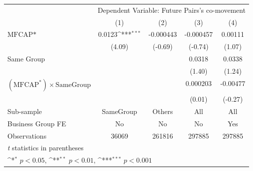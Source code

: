 {
\def\sym#1{\ifmmode^{#1}\else\(^{#1}\)\fi}
\begin{tabular}{l*{4}{c}}
\hline\hline
                &\multicolumn{4}{c}{Dependent Variable:  Future Pairs's co-movement}        \\\cmidrule(lr){2-5}
                &\multicolumn{1}{c}{(1)}         &\multicolumn{1}{c}{(2)}         &\multicolumn{1}{c}{(3)}         &\multicolumn{1}{c}{(4)}         \\
\hline
$ \text{MFCAP*} $&   0.0123\sym{***}&-0.000443         &-0.000457         &  0.00111         \\
                &   (4.09)         &  (-0.69)         &  (-0.74)         &   (1.07)         \\
[1em]
Same Group      &                  &                  &   0.0318         &   0.0338         \\
                &                  &                  &   (1.40)         &   (1.24)         \\
[1em]
 $ (\text{MFCAP}^*) \times {\text{SameGroup} }  $ &                  &                  & 0.000203         & -0.00477         \\
                &                  &                  &   (0.01)         &  (-0.27)         \\
\hline
Sub-sample      &SameGroup         &   Others         &      All         &      All         \\
Business Group FE&       No         &       No         &       No         &      Yes         \\
Observations    &    36069         &   261816         &   297885         &   297885         \\
\hline\hline
\multicolumn{5}{l}{\footnotesize \textit{t} statistics in parentheses}\\
\multicolumn{5}{l}{\footnotesize \sym{*} \(p<0.05\), \sym{**} \(p<0.01\), \sym{***} \(p<0.001\)}\\
\end{tabular}
}
